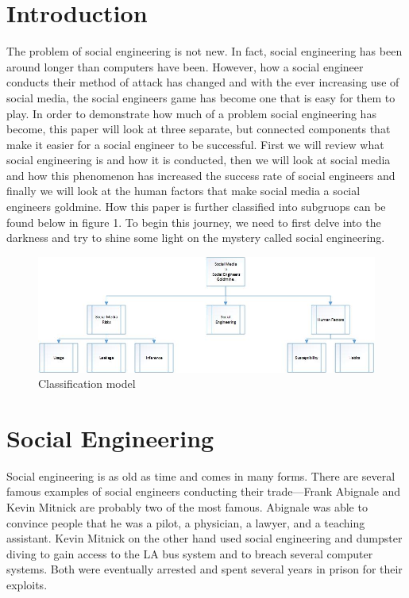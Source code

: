 \documentclass[conference]{IEEEtran}
\begin{document}
\section{Introduction}
The problem of social engineering is not new.  In fact, social engineering has been around longer than computers have been.  However, how a social engineer conducts their method of attack has changed and with the ever increasing use of social media, the social engineers game has become one that is easy for them to play. In order to demonstrate how much of a problem social engineering has become, this paper will look at three separate, but connected components that make it easier for a social engineer to be successful. First we will review what social engineering is and how it is conducted, then we will look at social media and how this phenomenon has increased the success rate of social engineers and finally we will look at the human factors that make social media a social engineers goldmine.  How this paper is further classified into subgruops can be found below in figure 1.  To begin this journey, we need to first delve into the darkness and try to shine some light on the mystery called social engineering. 
\begin{figure}[htbp]
\centerline{\includegraphics[scale= .40]{classification.jpg}}
\caption{Classification model }
\label{fig}
\end{figure}
\section{Social Engineering}

Social engineering is as old as time and comes in many forms.  There are several famous examples of social engineers conducting their trade—Frank Abignale and Kevin Mitnick are probably two of the most famous.  Abignale was able to convince people that he was a pilot, a physician, a lawyer, and a teaching assistant. Kevin Mitnick on the other hand used social engineering and dumpster diving to gain access to the LA bus system and to breach several computer systems. Both were eventually arrested and spent several years in prison for their exploits. 
\end{document}
